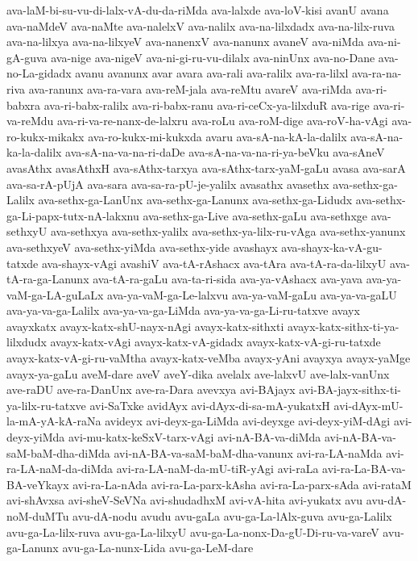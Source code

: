 {ava-laM-bi-su-vu-di-lalx-vA-du-da-riMda
ava-lalxde
ava-loV-kisi
avanU
avana
ava-naMdeV
ava-naMte
ava-nalelxV
ava-nalilx
ava-na-lilxdadx
ava-na-lilx-ruva
ava-na-lilxya
ava-na-lilxyeV
ava-nanenxV
ava-nanunx
avaneV
ava-niMda
ava-ni-gA-guva
ava-nige
ava-nigeV
ava-ni-gi-ru-vu-dilalx
ava-ninUnx
ava-no-Dane
ava-no-La-gidadx
avanu
avanunx
avar
avara
ava-rali
ava-ralilx
ava-ra-lilxl
ava-ra-na-riva
ava-ranunx
ava-ra-vara
ava-reM-jala
ava-reMtu
avareV
ava-riMda
ava-ri-babxra
ava-ri-babx-ralilx
ava-ri-babx-ranu
ava-ri-ceCx-ya-lilxduR
ava-rige
ava-ri-va-reMdu
ava-ri-va-re-nanx-de-lalxru
ava-roLu
ava-roM-dige
ava-roV-ha-vAgi
ava-ro-kukx-mikakx
ava-ro-kukx-mi-kukxda
avaru
ava-sA-na-kA-la-dalilx
ava-sA-na-ka-la-dalilx
ava-sA-na-va-na-ri-daDe
ava-sA-na-va-na-ri-ya-beVku
ava-sAneV
avasAthx
avasAthxH
ava-sAthx-tarxya
ava-sAthx-tarx-yaM-gaLu
avasa
ava-sarA
ava-sa-rA-pUjA
ava-sara
ava-sa-ra-pU-je-yalilx
avasathx
avasethx
ava-sethx-ga-Lalilx
ava-sethx-ga-LanUnx
ava-sethx-ga-Lanunx
ava-sethx-ga-Lidudx
ava-sethx-ga-Li-papx-tutx-nA-lakxnu
ava-sethx-ga-Live
ava-sethx-gaLu
ava-sethxge
ava-sethxyU
ava-sethxya
ava-sethx-yalilx
ava-sethx-ya-lilx-ru-vAga
ava-sethx-yanunx
ava-sethxyeV
ava-sethx-yiMda
ava-sethx-yide
avashayx
ava-shayx-ka-vA-gu-tatxde
ava-shayx-vAgi
avashiV
ava-tA-rAshacx
ava-tAra
ava-tA-ra-da-lilxyU
ava-tA-ra-ga-Lanunx
ava-tA-ra-gaLu
ava-ta-ri-sida
ava-ya-vAshacx
ava-yava
ava-ya-vaM-ga-LA-guLaLx
ava-ya-vaM-ga-Le-lalxvu
ava-ya-vaM-gaLu
ava-ya-va-gaLU
ava-ya-va-ga-Lalilx
ava-ya-va-ga-LiMda
ava-ya-va-ga-Li-ru-tatxve
avayx
avayxkatx
avayx-katx-shU-nayx-nAgi
avayx-katx-sithxti
avayx-katx-sithx-ti-ya-lilxdudx
avayx-katx-vAgi
avayx-katx-vA-gidadx
avayx-katx-vA-gi-ru-tatxde
avayx-katx-vA-gi-ru-vaMtha
avayx-katx-veMba
avayx-yAni
avayxya
avayx-yaMge
avayx-ya-gaLu
aveM-dare
aveV
aveY-dika
avelalx
ave-lalxvU
ave-lalx-vanUnx
ave-raDU
ave-ra-DanUnx
ave-ra-Dara
avevxya
avi-BAjayx
avi-BA-jayx-sithx-ti-ya-lilx-ru-tatxve
avi-SaTxke
avidAyx
avi-dAyx-di-sa-mA-yukatxH
avi-dAyx-mU-la-mA-yA-kA-raNa
avideyx
avi-deyx-ga-LiMda
avi-deyxge
avi-deyx-yiM-dAgi
avi-deyx-yiMda
avi-mu-katx-keSxV-tarx-vAgi
avi-nA-BA-va-diMda
avi-nA-BA-va-saM-baM-dha-diMda
avi-nA-BA-va-saM-baM-dha-vanunx
avi-ra-LA-naMda
avi-ra-LA-naM-da-diMda
avi-ra-LA-naM-da-mU-tiR-yAgi
avi-raLa
avi-ra-La-BA-va-BA-veYkayx
avi-ra-La-nAda
avi-ra-La-parx-kAsha
avi-ra-La-parx-sAda
avi-rataM
avi-shAvxsa
avi-sheV-SeVNa
avi-shudadhxM
avi-vA-hita
avi-yukatx
avu
avu-dA-noM-duMTu
avu-dA-nodu
avudu
avu-gaLa
avu-ga-La-lAlx-guva
avu-ga-Lalilx
avu-ga-La-lilx-ruva
avu-ga-La-lilxyU
avu-ga-La-nonx-Da-gU-Di-ru-va-vareV
avu-ga-Lanunx
avu-ga-La-nunx-Lida
avu-ga-LeM-dare
}
